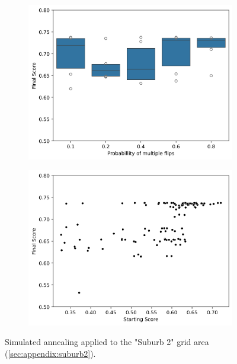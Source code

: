 \begin{figure}[H]
\begin{subfigure}{.5\textwidth}
      \caption{}
    \end{subfigure}\\
    \begin{subfigure}{.5\textwidth}
        \centering
        \includegraphics[width=\linewidth]{img/switchstate_exploring/suburb2/annealing_sampling/p_multi.png}
        \caption{}
    \end{subfigure}%
    \begin{subfigure}{.5\textwidth}
        \centering
        \includegraphics[width=\linewidth]{img/switchstate_exploring/suburb2/annealing_sampling/starting_score.png}
        \caption{}
    \end{subfigure}
    \caption{
        Simulated annealing applied to the "Suburb 2" grid area (\autoref{sec:appendix:suburb2}).
}
\end{figure}
